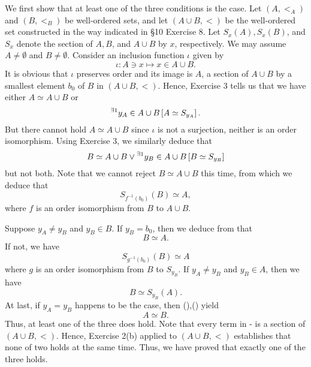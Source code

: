 \documentclass[a4paper,12pt]{article}
\begin{document}
\begin{sol}\leavevmode \par
	We first show that at least one of the three conditions is the case.
	Let \( (A,<_{A}) \) and \( (B,<_{B}) \) be well-ordered sets,
	and let \( (A\cup B,<) \) be the well-ordered set constructed in the way
	indicated in \S10 Exercise 8.
	Let \( S_{x}(A), S_{x}(B)\), and \(S_{x} \)
	denote the section of \( A, B\), and \( A\cup B \) by \( x \), respectively.
	We may assume \( A \neq \emptyset \) and \( B \neq \emptyset \).
	Consider an inclusion function \( \iota \) given by
	\begin{equation*}
		\iota : A \ni x \mapsto x \in A\cup B.
	\end{equation*}
	It is obvious that \( \iota \) preserves order and its image is \( A \),
	a section of \( A\cup B \) by a smallest element
	\( b_0 \) of \( B \) in \( (A\cup B,<) \).
	Hence, Exercise 3 tells us that we have either \( A\simeq A \cup B \) or
	\begin{equation}\label{secsupE4eq1}
		{}^{\exists 1} y_A \in A\cup B
		\left[ A \simeq S_{y_A} \right].
	\end{equation}
	But there cannot hold \( A\simeq A \cup B \) since \( \iota \) is not a surjection, neither is an order isomorphism. 
	Using Exercise 3, we similarly deduce that
	\begin{equation}\label{secsupE4eq2}
		B \simeq A \cup B
		\vee
		{}^{\exists 1} y_B \in A \cup B
		\left[ B \simeq S_{y_B} \right]
	\end{equation}
	but not both.
	Note that we cannot reject \( B \simeq A \cup B \) this time,
	from which we deduce that
	\begin{equation}\label{secsupE4eq3}
		S_{f^{-1}(b_0)}(B) \simeq A,
	\end{equation}
	where \( f \) is an order isomorphism from \( B \) to \( A\cup B \).
	
	Suppose \( y_A \neq y_B \) and \( y_B \in B \).
	If \( y_B = b_0 \),
	then we deduce from  that
	\begin{equation}\label{secsupE4eq4}
		B \simeq A.
	\end{equation}
	If not, we have
	\begin{equation}\label{secsupE4eq5}
		S_{g^{-1}(b_0)}(B) \simeq A
	\end{equation}
	where \( g \) is an order isomorphism from \( B \) to \( S_{y_B} \).
	If \( y_A \neq y_B \) and \( y_B \in A \),
	then we have
	\begin{equation}\label{secsupE4eq6}
		B \simeq S_{y_B}(A).
	\end{equation}
	At last, if \( y_A = y_B \) happens to be the case,
	then (),() yield
	\begin{equation}\label{secsupE4eq7}
		A \simeq B.
	\end{equation}
	Thus, at least one of the three does hold.
	Note that every term in  - 
	is a section of \( (A\cup B,<) \).
	Hence, Exercise 2(b) applied to \( (A\cup B,<) \) establishes that
	none of two holds at the same time.
	Thus, we have proved that exactly one of the three holds.
	

\end{sol}
\end{document}
